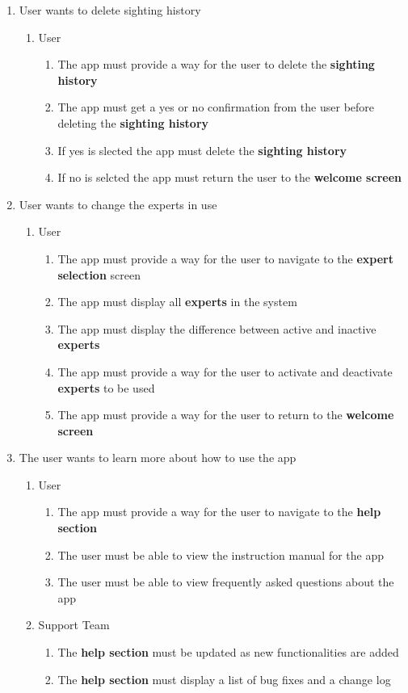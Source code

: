 \documentclass[]{article}
\begin{document}
\begin{enumerate}[{BE}1.]
	\item User wants to delete sighting history
	\begin{enumerate}[{VP5}.1]
		\item User
			\begin{enumerate}
				\item The app must provide a way for the user to delete the \textbf{sighting history}
				\item The app must get a yes or no confirmation from the user before deleting the \textbf{sighting history}
				\item If yes is slected the app must delete the \textbf{sighting history}
				\item If no is selcted the app must return the user to the \textbf{welcome screen}
			\end{enumerate}
	\end{enumerate}


	\item User wants to change the experts in use
	\begin{enumerate}[{VP6}.1]
		\item User
			\begin{enumerate}
				\item The app must provide a way for the user to navigate to the \textbf{expert selection} screen
				\item The app must display all \textbf{experts} in the system
				\item The app must display the difference between active and inactive \textbf{experts}
				\item The app must provide a way for the user to activate and deactivate \textbf{experts} to be used
				\item The app must provide a way for the user to return to the \textbf{welcome screen}
			\end{enumerate}
		\end{enumerate}


	\item The user wants to learn more about how to use the app
	\begin{enumerate}[{VP7}.1]
		\item User
			\begin{enumerate}
				\item The app must provide a way for the user to navigate to the \textbf{help section}
				\item The user must be able to view the instruction manual for the app
				\item The user must be able to view frequently asked questions about the app
			\end{enumerate}
		\item Support Team
			\begin{enumerate}
				\item The \textbf{help section} must be updated as new functionalities are added
				\item The \textbf{help section} must display a list of bug fixes and a change log
			\end{enumerate}
	\end{enumerate}
\end{enumerate}
\cbend
\end{document}
